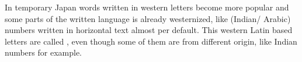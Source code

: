 

In temporary Japan words written in western letters become more popular and
some parts of the written language is already westernized, like (Indian/
Arabic) numbers written in horizontal text almost per default. This western
Latin based letters are called , even
though some of them are from different origin, like Indian numbers for example.


